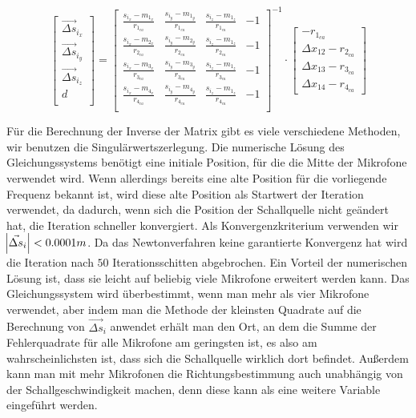 $$
\begin{bmatrix}
\vec{\Delta{s}}_{i_x} \\
\vec{\Delta{s}}_{i_y} \\
\vec{\Delta{s}}_{i_z} \\
                d \\
\end{bmatrix}
=
{\begin{bmatrix}
\frac{s_{i_x} - m_{1_x}}{r_{1_{ca}}} & \frac{s_{i_y} - m_{1_y}}{r_{1_{ca}}} & \frac{s_{i_z} - m_{1_z}}{r_{1_{ca}}} & -1 \\
\frac{s_{i_x} - m_{2_x}}{r_{2_{ca}}} & \frac{s_{i_y} - m_{2_y}}{r_{2_{ca}}} & \frac{s_{i_z} - m_{1_z}}{r_{2_{ca}}} & -1 \\
\frac{s_{i_x} - m_{3_x}}{r_{3_{ca}}} & \frac{s_{i_y} - m_{3_y}}{r_{3_{ca}}} & \frac{s_{i_z} - m_{1_z}}{r_{3_{ca}}} & -1 \\
\frac{s_{i_x} - m_{4_x}}{r_{4_{ca}}} & \frac{s_{i_y} - m_{4_y}}{r_{4_{ca}}} & \frac{s_{i_z} - m_{1_z}}{r_{4_{ca}}} & -1 \\
\end{bmatrix}}^{-1}
\cdot
\begin{bmatrix}
-r_{1_{ca}}\\
\Delta{x_{12}} - r_{2_{ca}}\\
\Delta{x_{13}} - r_{3_{ca}}\\
\Delta{x_{14}} - r_{4_{ca}}
\end{bmatrix}
$$

Für die Berechnung der Inverse der Matrix gibt es viele verschiedene Methoden, wir benutzen die Singulärwertszerlegung. Die numerische Lösung des Gleichungssystems benötigt eine initiale Position, für die die Mitte der Mikrofone verwendet wird. Wenn allerdings bereits eine alte Position für die vorliegende Frequenz bekannt ist, wird diese alte Position als Startwert der Iteration verwendet, da dadurch, wenn sich die Position der Schallquelle nicht geändert hat, die Iteration schneller konvergiert. Als Konvergenzkriterium verwenden wir $\abs{\vec{\Delta{s}}_i} < 0.0001m$. Da das Newtonverfahren keine garantierte Konvergenz hat wird die Iteration nach $50$ Iterationsschitten abgebrochen.
Ein Vorteil der numerischen Lösung ist, dass sie leicht auf beliebig viele Mikrofone erweitert werden kann. Das Gleichungssystem wird überbestimmt, wenn man mehr als vier Mikrofone verwendet, aber indem man die Methode der kleinsten Quadrate auf die Berechnung von $\vec{\Delta{s}}_i$ anwendet erhält man den Ort, an dem die Summe der Fehlerquadrate für alle Mikrofone am geringsten ist, es also am wahrscheinlichsten ist, dass sich die Schallquelle wirklich dort befindet. Außerdem kann man mit mehr Mikrofonen die Richtungsbestimmung auch unabhängig von der Schallgeschwindigkeit machen, denn diese kann als eine weitere Variable eingeführt werden.